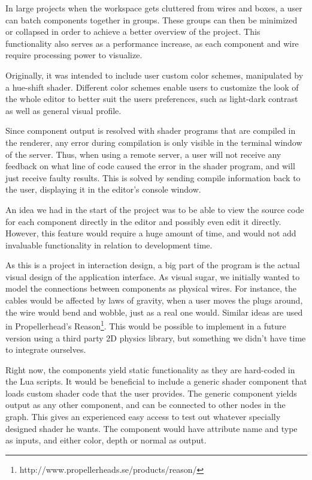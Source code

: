 In large projects when the workspace gets cluttered from wires and boxes, a user can batch components together in groups. These groups can then be minimized or collapsed in order to achieve a better overview of the project. This functionality also serves as a performance increase, as each component and wire require processing power to visualize. 

Originally, it was intended to include user custom color schemes, manipulated by a hue-shift shader. Different color schemes enable users to customize the look of the whole editor to better suit the users preferences, such as light-dark contrast as well as general visual profile.

Since component output is resolved with shader programs that are compiled in the renderer, any error during compilation is only visible in the terminal window of the server. Thus, when using a remote server, a user will not receive any feedback on what line of code caused the error in the shader program, and will just receive faulty results. This is solved by sending compile information back to the user, displaying it in the editor's console window. 

An idea we had in the start of the project was to be able to view the source code for each component directly in the editor and possibly even edit it directly. However, this feature would require a huge amount of time, and would not add invaluable functionality in relation to development time. 


As this is a project in interaction design, a big part of the program is the actual visual design of the application interface. As visual sugar, we initially wanted to model the connections between components as physical wires. For instance, the cables would be affected by laws of gravity, when a user moves the plugs around, the wire would bend and wobble, just as a real one would. Similar ideas are used in Propellerhead's Reason\footnote{http://www.propellerheads.se/products/reason/}. This would be possible to implement in a future version using a third party 2D physics library, but something we didn't have time to integrate ourselves.


Right now, the components yield static functionality as they are hard-coded in the Lua scripts. It would be beneficial to include a generic shader component that loads custom shader code that the user provides. The generic component yields output as any other component, and can be connected to other nodes in the graph. This gives an experienced easy access to test out whatever specially designed shader he wants. The component would have attribute name and type as inputs, and either color, depth or normal as output.


